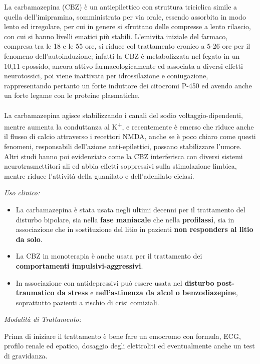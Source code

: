 \begin{itemize}
La carbamazepina (CBZ) è un antiepilettico con struttura triciclica
simile a quella dell'imipramina, somministrata per via orale, essendo
assorbita in modo lento ed irregolare, per cui in genere si sfruttano
delle compresse a lento rilascio, con cui si hanno livelli ematici più
stabili. L'emivita iniziale del farmaco, compresa tra le 18 e le 55 ore,
si riduce col trattamento cronico a 5-26 ore per il fenomeno
dell'autoinduzione; infatti la CBZ è metabolizzata nel fegato in un
10,11-epossido, ancora attivo farmacologicamente ed associata a diversi
effetti neurotossici, poi viene inattivata per idrossilazione e
coniugazione, rappresentando pertanto un forte induttore dei citocromi
P-450 ed avendo anche un forte legame con le proteine plasmatiche.
\\\\
La carbamazepina agisce stabilizzando i canali del sodio
voltaggio-dipendenti, mentre aumenta la conduttanza al
K\textsuperscript{+}, e recentemente è emerso che riduce anche il flusso
di calcio attraverso i recettori NMDA, anche se è poco chiaro come
questi fenomeni, responsabili dell'azione anti-epilettici, possano
stabilizzare l'umore. Altri studi hanno poi evidenziato come la CBZ
interferisca con diversi sistemi neurotrasmettitori ali ed abbia effetti
soppressivi sulla stimolazione limbica, mentre riduce l'attività della
guanilato e dell'adenilato-ciclasi.

\emph{\emph{Uso clinico:}}

\begin{itemize}
\item
  La carbamazepina è stata usata negli ultimi decenni per il trattamento
  del disturbo bipolare, sia nella \textbf{fase maniacale} che nella
  \textbf{profilassi}, sia in associazione che in sostituzione del litio
  in pazienti \textbf{non responders al litio da solo}.
\item
  La CBZ in monoterapia è anche usata per il trattamento dei
  \textbf{comportamenti impulsivi-aggressivi}.
\item
  In associazione con antidepressivi può essere usata nel
  \textbf{disturbo post-traumatico da stress} e \textbf{nell'astinenza
  da alcol o benzodiazepine}, soprattutto pazienti a rischio di crisi
  comiziali.
\end{itemize}

\emph{\emph{Modalità di Trattamento:}}

Prima di iniziare il trattamento è bene fare un emocromo con formula,
ECG, profilo renale ed epatico, dosaggio degli elettroliti ed
eventualmente anche un test di gravidanza.


\end{itemize}
